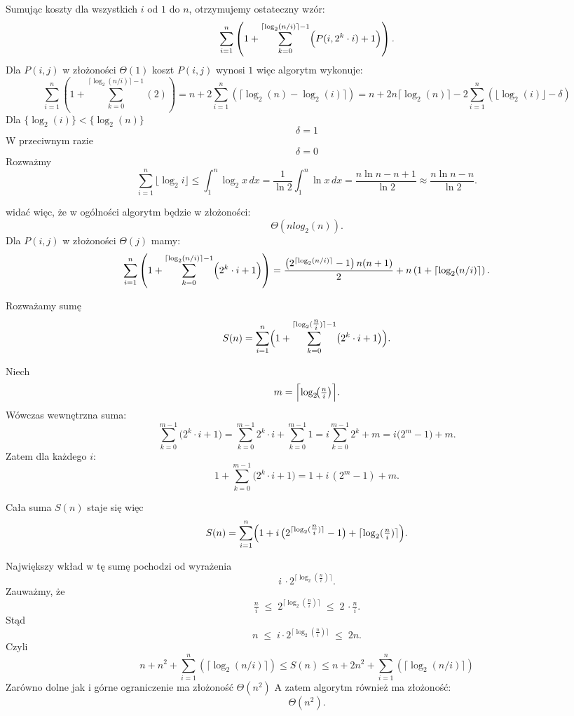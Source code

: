\documentclass[12pt]{article}
\begin{document}
\begin{enumerate}
    Sumując koszty dla wszystkich \(i\) od \(1\) do \(n\), otrzymujemy ostateczny wzór:
    \[
    \sum_{i=1}^{n}\left( 1 + \sum_{k=0}^{\lceil \log_2(n/i) \rceil - 1} \Bigl(P(i,2^k\cdot i) + 1\Bigr) \right).
    \]
     Dla $P(i,j)$ w złożoności $\Theta(1)$ koszt $P(i, j)$ wynosi $1$ więc algorytm wykonuje:
     $$\sum_{i=1}^{n}\left( 1 + \sum_{k=0}^{\lceil \log_2(n/i) \rceil - 1} (2) \right) = n + 2\sum_{i=1}^{n}(\lceil \log_2(n) - \log_2(i) \rceil) = n + 2n \lceil\log_2(n)\rceil - 2\sum_{i=1}^{n}(\lfloor \log_2(i) \rfloor - \delta)$$
     Dla $\{\log_2(i)\} < \{\log_2(n)\}$
     $$\delta = 1$$
     W przeciwnym razie 
     $$\delta = 0$$
    Rozważmy 
     $$\sum_{i=1}^{n} \lfloor \log_2 i \rfloor 
\leq \int_1^n \log_2 x \,dx 
= \frac{1}{\ln 2} \int_1^n \ln x \,dx 
= \frac{n \ln n - n + 1}{\ln 2} 
\approx \frac{n \ln n - n}{\ln 2}.$$

	widać więc, że w ogólności algorytm będzie w złożoności: 
	\[
		\Theta(nlog_2(n)).
	\]
    Dla $P(i, j)$ w złożoności $\Theta(j)$ mamy:
    \[
    \sum_{i=1}^{n}\left( 1 + \sum_{k=0}^{\lceil \log_2(n/i) \rceil - 1} \Bigl(2^k\cdot i + 1\Bigr) \right) = \frac{\left(2^{\lceil \log_2(n/i) \rceil} - 1\right) n(n+1)}{2} + n\left(1 + \lceil \log_2(n/i) \rceil\right).
    \]


Rozważamy sumę
\[
S(n) = \sum_{i=1}^{n} \Bigl(1 + \sum_{k=0}^{\lceil \log_2(\tfrac{n}{i})\rceil - 1} \bigl(2^k \cdot i + 1\bigr)\Bigr).
\]

Niech
\[
m = \Bigl\lceil \log_2\!\bigl(\tfrac{n}{i}\bigr)\Bigr\rceil.
\]
Wówczas wewnętrzna suma:
\[
\sum_{k=0}^{m-1} \bigl(2^k \cdot i + 1\bigr)
= \sum_{k=0}^{m-1} 2^k \cdot i + \sum_{k=0}^{m-1} 1
= i \sum_{k=0}^{m-1} 2^k + m
= i\bigl(2^m - 1\bigr) + m.
\]
Zatem dla każdego \(i\):
\[
1 + \sum_{k=0}^{m-1} \bigl(2^k \cdot i + 1\bigr)
= 1 + i\,(2^m - 1) + m.
\]

Cała suma \(S(n)\) staje się więc
\[
S(n)
= \sum_{i=1}^{n} \Bigl(1 + i\,\bigl(2^{\lceil \log_2(\tfrac{n}{i})\rceil} - 1\bigr) + \lceil \log_2(\tfrac{n}{i})\rceil\Bigr).
\]

Największy wkład w tę sumę pochodzi od wyrażenia
\[
i \,\cdot 2^{\lceil \log_2(\tfrac{n}{i})\rceil}.
\]
Zauważmy, że
\[
\tfrac{n}{i}
\;\le\;
2^{\lceil \log_2(\tfrac{n}{i})\rceil}
\;\le\;
2 \,\cdot \tfrac{n}{i}.
\]
Stąd
\[
n
\;\le\;
i \cdot 2^{\lceil \log_2(\tfrac{n}{i})\rceil}
\;\le\;
2n.
\]
Czyli 
$$ n + n^2 + \sum_{i=1}^{n}\left( \lceil \log_2(n/i) \rceil\right) \leq S(n) \leq n + 2n^2 + \sum_{i=1}^{n}\left( \lceil \log_2(n/i) \rceil\right)$$
Zarówno dolne jak i górne ograniczenie ma złożoność $\Theta(n^2)$ 
A zatem algorytm również ma złożoność:
\[
\Theta(n^2).
\]

\end{enumerate}
\end{document}
